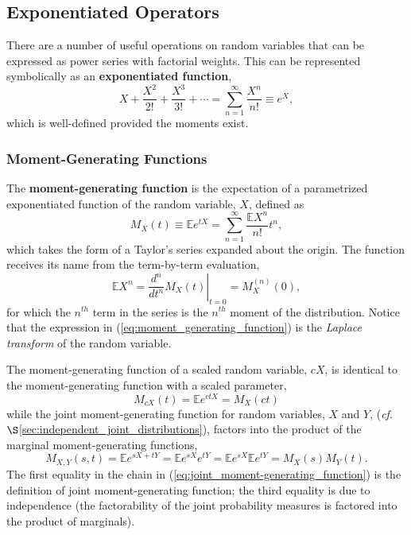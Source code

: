 \documentclass[12pt, twoside, draft]{article}
\begin{document}
\subsection{Exponentiated Operators}\label{sec:exponentiated_operators}
There are a number of useful operations on random variables that can be expressed as power series with factorial weights.  This can be represented symbolically as an \textbf{exponentiated function},
\begin{equation}
X + \frac{X^2}{2!}+ \frac{X^3}{3!}+ \cdots = \sum_{n=1}^\infty \frac{X^n}{n!} \equiv e^{X},
\end{equation}
which is well-defined provided the moments exist.

\subsubsection{Moment-Generating Functions}\label{sec:moment-generating_functions}
The \textbf{moment-generating function} is the expectation of a parametrized exponentiated function of the random variable, $X$, defined as
\begin{equation}\label{eq:moment_generating_function}
M_X(t) \equiv \mathbb{E}e^{tX} = \sum_{n=1}^\infty \frac{\mathbb{E}X^n}{n!}t^n,
\end{equation}
which takes the form of a Taylor's series expanded about the origin.  The function receives its name from the term-by-term evaluation,
\begin{equation}
\mathbb{E}X^n = \left. \frac{d^n}{dt^n}M_X(t) \right|_{t=0} = M_X^{(n)}(0),
\end{equation}
for which the $n^{th}$ term in the series is the $n^{th}$ moment of the distribution.  Notice that the expression in (\ref{eq:moment_generating_function}) is the \textit{Laplace transform} of the random variable.

The moment-generating function of a scaled random variable, $cX$, is identical to the moment-generating function with a scaled parameter,
\begin{equation}
M_{cX}(t) = \mathbb{E}e^{ctX} = M_X(ct)
\end{equation}
while the joint moment-generating function for  random variables, $X$ and $Y$, (\textit{cf.} $\S$\ref{sec:independent_joint_distributions}), factors into the product of the marginal moment-generating functions,
\begin{equation}\label{eq:joint_moment-generating_function}
M_{X,Y}(s, t) = \mathbb{E}e^{sX+tY} = \mathbb{E}e^{sX}e^{tY} = \mathbb{E}e^{sX}\mathbb{E}e^{tY} = M_X(s)M_Y(t).
\end{equation}
The first equality in the chain in (\ref{eq:joint_moment-generating_function}) is the definition of joint moment-generating function; the third equality is due to independence (the factorability of the joint probability measures is factored into the product of marginals).  
\end{document}
